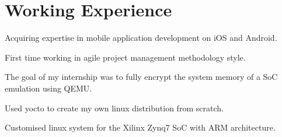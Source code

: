 \documentclass[]{resume}
\begin{document}
\begin{minipage}[t]{0.66\textwidth} 	
\section{Working Experience}

	 
	\vspace{\topsep} %
	\begin{tightemize}
		
		\item Acquiring expertise in mobile application development on iOS and Android. 
		\item First time working in agile project management methodology style. 
		
	\end{tightemize}
	\sectionsep


	 
	\begin{tightemize}
		
		\item The goal of my internship was to fully encrypt the system memory of a SoC emulation using QEMU.
		\item Used yocto to create my own linux distribution from scratch.
		\item Customised linux system for the Xilinx Zynq7 SoC with ARM architecture. 

	\end{tightemize}
	\sectionsep

	 
	\begin{tightemize}
		

\end{tightemize}
\end{minipage}
\end{document}
